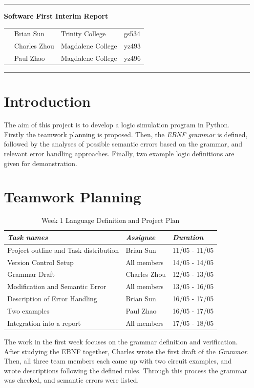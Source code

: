 \documentclass[12pt]{article}
\def\n{\noindent}
\begin{document}
\vspace{0.3cm}
\rule{15.7cm}{0.5mm}

\begin{center}
{\hspace{0.6cm}\Large \textbf {Software First Interim Report}\\
}
\end{center}
\begin{table}[H]
\centering
\begin{tabular}{ p{2cm}p{3cm}p{4cm} p{3cm}} 
&Brian Sun & Trinity College & gs534 \\ 
&Charles Zhou & Magdalene College & yz493 \\ 
&Paul Zhao & Magdalene College & yz496 \\ 
\end{tabular}
\end{table}


\begin{center}
\rule{15.7cm}{0.5mm}
\end{center}

\section{Introduction}
\n The aim of this project is to develop a logic simulation program in Python. Firstly the teamwork planning is proposed. Then, the \textit{EBNF grammar} is defined, followed by the analyses of possible semantic errors based on the grammar, and relevant error handling approaches. Finally, two example logic definitions are given for demonstration. 
\section{Teamwork Planning}
\begin{table}[H]
\begin{tabular}{p{8cm}p{4cm}p{3cm}}
\textit{Task names} & \textit{Assignee}&\textit{Duration}\\
\hline
Project outline and Task distribution & Brian Sun & 11/05 - 11/05\\
Version Control Setup & All members & 14/05 - 14/05\\
Grammar Draft 	& Charles Zhou & 12/05 - 13/05\\
Modification and Semantic Error & All members & 13/05 - 16/05\\
Description of Error Handling & Brian Sun & 16/05 - 17/05\\
Two examples & Paul Zhao & 16/05 - 17/05\\
Integration into a report & All members & 17/05 - 18/05\\
\end{tabular}
\caption{Week 1 Language Definition and Project Plan}
\end{table}
\n The work in the first week focuses on the grammar definition and verification. After studying the EBNF together, Charles wrote the first draft of the \textit{Grammar}. Then, all three team members each came up with two circuit examples, and wrote descriptions following the defined rules. Through this process the grammar was checked, and semantic errors were listed. \\
\end{document}
